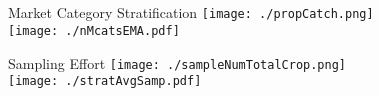 \documentclass[ xcolor = pdftex, dvipsnames, table ]{beamer}
\begin{document}
\subsection{}
\begin{frame}{Market Category Stratification}
	\hspace*{-0.75cm}
	\texttt{[image: ./propCatch.png]}\\%
	\vspace{-0.9cm}
	\hspace*{-0.9cm}
	\texttt{[image: ./nMcatsEMA.pdf]}
	\vspace{-7cm}
	\hspace*{6.78cm}
	\hspace*{-1.4115cm}
\end{frame}

%
%

\begin{frame}{Sampling Effort}
       	\hspace*{-0.75cm}
       	\texttt{[image: ./sampleNumTotalCrop.png]}\\
       	\vspace{-0.9cm}
       	\hspace*{-0.9cm}
       	\texttt{[image: ./stratAvgSamp.pdf]}
	\vspace{-7cm}
	\hspace*{4.075cm}
	\hspace*{-2.195cm}
\end{frame}

%
%
\end{document}
